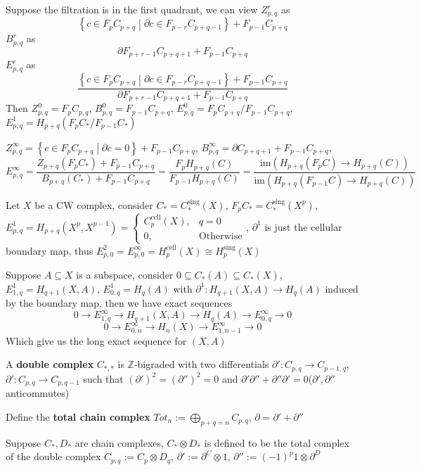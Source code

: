 \documentclass[../main.tex]{subfiles}
\begin{document}
\begin{remark}
Suppose the filtration is in the first quadrant, we can view $Z^r_{p,q}$ as
\[\left\{c\in F_pC_{p+q}\middle|\partial c\in F_{p-r}C_{p+q-1}\right\}+F_{p-1}C_{p+q}\]
$B^r_{p,q}$ as
\[\partial F_{p+r-1}C_{p+q+1}+F_{p-1}C_{p+q}\]
$E^r_{p,q}$ as
\[\frac{\left\{c\in F_pC_{p+q}\middle|\partial c\in F_{p-r}C_{p+q-1}\right\}+F_{p-1}C_{p+q}}{\partial F_{p+r-1}C_{p+q+1}+F_{p-1}C_{p+q}}\]
Then $Z^0_{p,q}=F_pC_{p,q}$, $B^0_{p,q}=F_{p-1}C_{p+q}$, $E^0_{p,q}=F_pC_{p+q}/F_{p-1}C_{p+q}$, $E^1_{p,q}=H_{p+q}(F_pC_*/F_{p-1}C_*)$ \par
$Z^\infty_{p,q}=\left\{c\in F_pC_{p+q}\middle|\partial c=0\right\}+F_{p-1}C_{p+q}$, $B^\infty_{p,q}=\partial C_{p+q+1}+F_{p-1}C_{p+q}$, $E^\infty_{p,q}=\dfrac{Z_{p+q}(F_pC_*)+F_{p-1}C_{p+q}}{B_{p+q}(C_*)+F_{p-1}C_{p+q}}=\dfrac{F_pH_{p+q}(C)}{F_{p-1}H_{p+q}(C)}=\dfrac{\mathrm{im}(H_{p+q}(F_pC)\to H_{p+q}(C))}{\mathrm{im}(H_{p+q}(F_{p-1}C)\to H_{p+q}(C))}$
\end{remark}

\begin{example}
Let $X$ be a CW complex, consider $C_*=C_*^{\mathrm{sing}}(X)$, $F_pC_*=C_*^{\mathrm{sing}}(X^p)$, $E^1_{p,q}=H_{p+q}(X^p,X^{p-1})=\begin{cases}
C^\mathrm{cell}_p(X), &q=0 \\
0, & \text{Otherwise}
\end{cases}$, $\partial^1$ is just the cellular boundary map, thus $E^2_{p,0}=E^\infty_{p,0}=H_p^{\mathrm{cell}}(X)\cong H^\mathrm{sing}_p(X)$
\end{example}

\begin{example}
Suppose $A\subseteq X$ is a subspace, consider $0\subseteq C_*(A)\subseteq C_*(X)$, $E^1_{1,q}=H_{q+1}(X,A)$, $E^1_{0,q}=H_q(A)$ with $\partial^1:H_{q+1}(X,A)\to H_q(A)$ induced by the boundary map, then we have exact sequences
\[0\to E^\infty_{1,q}\to H_{q+1}(X,A)\to H_q(A)\to E^\infty_{0,q}\to0\]
\[0\to E^\infty_{0,n}\to H_n(X)\to E^\infty_{1,n-1}\to0\]
Which give us the long exact sequence for $(X,A)$
\end{example}

\begin{definition}
A \textbf{double complex} $C_{*,*}$ is $\mathbb Z$-bigraded with two differentials $\partial':C_{p,q}\to C_{p-1,q}$, $\partial':C_{p,q}\to C_{p,q-1}$ such that $(\partial')^2=(\partial'')^2=0$ and $\partial'\partial''+\partial''\partial'=0$($\partial',\partial''$ anticommutes) \par
Define the \textbf{total chain complex} $Tot_n:=\displaystyle\bigoplus_{p+q=n}C_{p,q}$, $\partial=\partial'+\partial''$
\end{definition}

\begin{example}
Suppose $C_*,D_*$ are chain complexes, $C_*\otimes D_*$ is defined to be the total complex of the double complex $C_{p,q}:= C_p\otimes D_q$, $\partial':=\partial^C\otimes1$, $\partial'':=(-1)^p1\otimes\partial^D$
\end{example}
\end{document}
